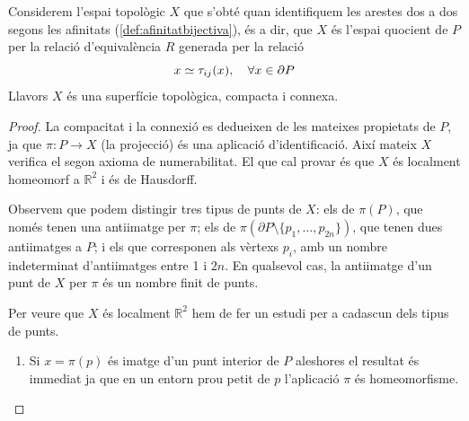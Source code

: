\documentclass[../main.tex]{subfiles}
\begin{document}
\begin{ter}
\label{ter:superficiecompactaiconnexa} Considerem l'espai topològic $X$ que s'obté quan identifiquem les arestes dos a dos segons les afinitats (\ref{def:afinitatbijectiva}), és a dir, que $X$ és l'espai quocient de $P$ per la relació d'equivalència $R$ generada per la relació
\begin{equation}
    \notag
    x\simeq \tau_{ij}(x),\quad \forall x\in \partial P
\end{equation}
Llavors $X$ és una superfície topològica, compacta i connexa.
\end{ter}
\begin{proof}
La compacitat i la connexió es dedueixen de les mateixes propietats de $P$, ja que $\pi:P\rightarrow X$ (la projecció) és una aplicació d'identificació. Així mateix $X$ verifica el segon axioma de numerabilitat. El que cal provar és que $X$ és localment homeomorf a $\mathbb{R}^2$ i és de Hausdorff.

Observem que podem distingir tres tipus de punts de $X$: els de $\pi(P)$, que només tenen una antiimatge per $\pi$; els de $\pi(\partial P\setminus\{p_1,\ldots,p_{2n}\})$, que tenen dues antiimatges a $P$; i els que corresponen als vèrtexs $p_i$, amb un nombre indeterminat d'antiimatges entre 1 i $2n$. En qualsevol cas, la antiimatge d'un punt de $X$ per $\pi$ és un nombre finit de punts.

Per veure que $X$ és localment $\mathbb{R}^2$ hem de fer un estudi per a cadascun dels tipus de punts.
\begin{enumerate}
    \item Si $x = \pi(p)$ és imatge d'un punt interior de $P$ aleshores el resultat és immediat ja que en un entorn prou petit de $p$ l'aplicació $\pi$ és homeomorfisme.
    

\end{enumerate}
\end{proof}
\end{document}
